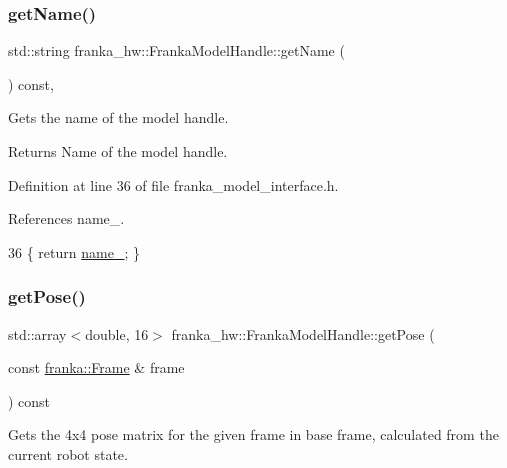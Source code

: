 \subsubsection{\texorpdfstring{get\+Name()}{getName()}}
{\footnotesize\ttfamily std\+::string franka\+\_\+hw\+::\+Franka\+Model\+Handle\+::get\+Name (\begin{DoxyParamCaption}{ }\end{DoxyParamCaption}) const\hspace{0.3cm}{\ttfamily [inline]}, {\ttfamily [noexcept]}}

Gets the name of the model handle.

\begin{DoxyReturn}{Returns}
Name of the model handle. 
\end{DoxyReturn}


Definition at line 36 of file franka\+\_\+model\+\_\+interface.\+h.



References name\+\_\+.


\begin{DoxyCode}
36 \{ \textcolor{keywordflow}{return} \hyperlink{classfranka__hw_1_1FrankaModelHandle_ab2e979b4a0e4ca3d68488f2d0432c066}{name\_}; \}
\end{DoxyCode}
\mbox{\label{classfranka__hw_1_1FrankaModelHandle_af6617a4a3a89908c4a0aa8d25b2bfc07}} 
\subsubsection{\texorpdfstring{get\+Pose()}{getPose()}\hspace{0.1cm}{\footnotesize\ttfamily [1/2]}}
{\footnotesize\ttfamily std\+::array$<$double, 16$>$ franka\+\_\+hw\+::\+Franka\+Model\+Handle\+::get\+Pose (\begin{DoxyParamCaption}\item[{const \hyperlink{namespacefranka_a00b729ddce916481d3f0d10febec4f5b}{franka\+::\+Frame} \&}]{frame }\end{DoxyParamCaption}) const\hspace{0.3cm}{\ttfamily [inline]}}

Gets the 4x4 pose matrix for the given frame in base frame, calculated from the current robot state.


